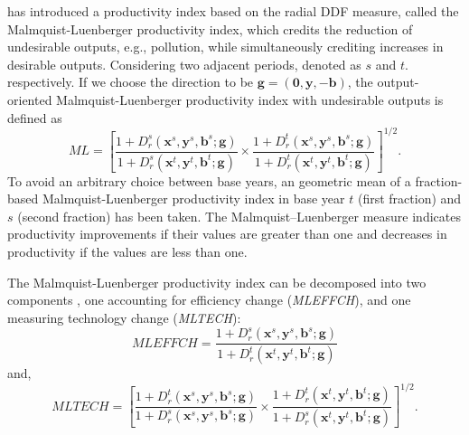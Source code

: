 \cite{Chung1997} has introduced a productivity index based on the radial DDF measure, called the Malmquist-Luenberger productivity index, which credits the reduction of undesirable outputs, e.g., pollution, while simultaneously crediting increases in desirable outputs. Considering two adjacent periods, denoted as $s$ and $t$. respectively. If we choose the direction to be ${\pmb{g}} = (\pmb{0},\pmb{y}, - \pmb{b})$, the output-oriented Malmquist-Luenberger productivity index with undesirable outputs is defined as
\begin{equation}\label{eq_mpi}
    \textit{ML} %
    = {\left[ {\frac{{1 + D _r^s({{\pmb{x}}^s},{{\pmb{y}}^s},{{\pmb{b}}^s};{\pmb{g}})}}{{1 + D _r^s({{\pmb{x}}^t},{{\pmb{y}}^t},{{\pmb{b}}^t};{\pmb{g}})}} 
    \times 
    \frac{{1 + D _r^t({{\pmb{x}}^s},{{\pmb{y}}^s},{{\pmb{b}}^s};{\pmb{g}})}}{{1 + D _r^t({{\pmb{x}}^t},{{\pmb{y}}^t},{{\pmb{b}}^t};{\pmb{g}})}}} \right]^{1/2}}.
\end{equation}
To avoid an arbitrary choice between base years, an geometric mean of a fraction-based Malmquist-Luenberger productivity index in base year $t$ (first fraction) and $s$ (second fraction) has been taken. The Malmquist–Luenberger measure indicates productivity improvements if their values are greater than one and decreases in productivity if the values are less than one. 

The Malmquist-Luenberger productivity index can be decomposed into two components \citep{Chung1997}, one accounting for efficiency change (\textit{MLEFFCH}), and one measuring technology change (\textit{MLTECH}):
\begin{equation}
    \textit{MLEFFCH} %
    = \frac{{1 + D _r^s({{\pmb{x}}^s},{{\pmb{y}}^s},{{\pmb{b}}^s};{\pmb{g}})}}{{1 + D _r^t({{\pmb{x}}^t},{{\pmb{y}}^t},{{\pmb{b}}^t};{\pmb{g}})}}
\end{equation}
and,
\begin{equation}
    \textit{MLTECH} %
    = {\left[ {\frac{{1 + D _r^t({{\pmb{x}}^s},{{\pmb{y}}^s},{{\pmb{b}}^s};{\pmb{g}})}}{{1 + D _r^s({{\pmb{x}}^s},{{\pmb{y}}^s},{{\pmb{b}}^s};{\pmb{g}})}} 
    \times 
    \frac{{1 + D _r^t({{\pmb{x}}^t},{{\pmb{y}}^t},{{\pmb{b}}^t};{\pmb{g}})}}{{1 + D _r^s({{\pmb{x}}^t},{{\pmb{y}}^t},{{\pmb{b}}^t};{\pmb{g}})}}} \right]^{1/2}}.
\end{equation}

